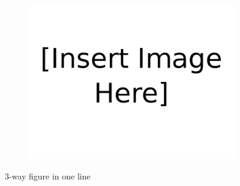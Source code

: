 \begin{figure}[H]
\begin{subfigure}{0.33\textwidth}
    \includegraphics[width=\linewidth]{figures/Insert_image_here.png}
    \caption{}\label{fig:1.3}
\end{subfigure}
\caption{3-way figure in one line}
\label{3-way figure in one line}
\end{figure}


